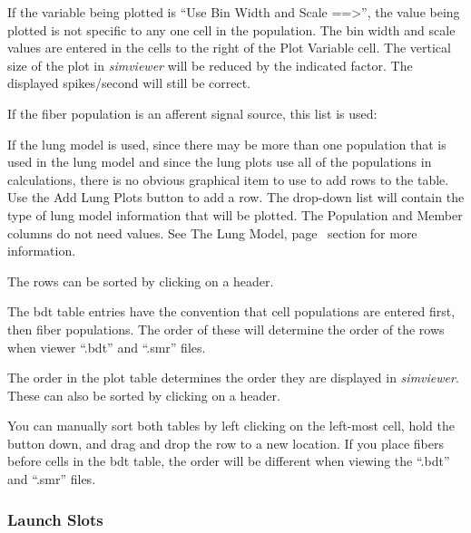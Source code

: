 \documentclass[12pt,openany,oneside]{book}
\newcommand{\tiref}[1]{#1, page~\pageref{#1}}
\newcommand{\prog}[1]{\textit{{#1}}}
\newcommand{\ext}[1]{{{``.#1''}}}
\newcommand{\inquotes}[1]{{{``#1''}}}
\begin{document}
If the variable being plotted is \inquotes{Use Bin Width and Scale
==\textgreater}, the value being plotted is not specific to any one cell in
the population. The bin width and scale values are entered in the cells
to the right of the Plot Variable cell. The vertical size of the plot in
\prog{simviewer} will be reduced by the indicated factor. The displayed
spikes/second will still be correct.

If the fiber population is an afferent signal source, this list is used:
\bigskip


\bigskip

If the lung model is used, since there may be more than one population
that is used in the lung model and since the lung plots use all of the
populations in calculations, there is no obvious graphical item to use to
add rows to the table. Use the Add Lung Plots button to add a row. The
drop-down list will contain the type of lung model information that will be
plotted. The Population and Member columns do not need values. See
\tiref{The Lung Model} section for more information.

The rows can be sorted by clicking on a header.

The bdt table entries have the convention that cell populations are
entered first, then fiber populations. The order of these will determine
the order of the rows when viewer \ext{bdt} and \ext{smr} files. 

The order in the plot table determines the order they are displayed in
\prog{simviewer}. These can also be sorted by clicking on a header.

You can manually sort both tables by left clicking on the left-most cell,
hold the button down, and drag and drop the row to a new location. If you
place fibers before cells in the bdt table, the order will be different
when viewing the \ext{bdt} and \ext{smr} files.


\subsubsection{Launch Slots}
\end{document}
